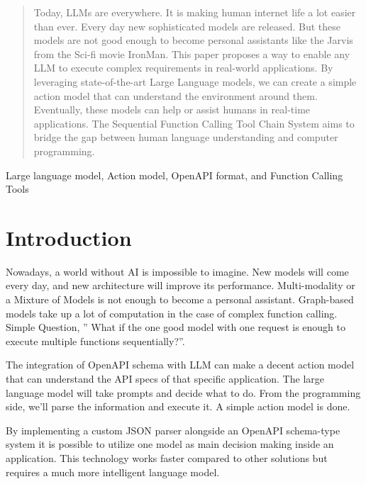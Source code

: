 \documentclass[conference]{IEEEtran}
\begin{document}
\maketitle

\begin{abstract}
    Today, LLMs are everywhere. It is making human internet life a lot easier than ever. Every day new sophisticated models are released. But these models are not good enough to become personal assistants like the Jarvis from the Sci-fi movie IronMan. This paper proposes a way to enable any LLM to execute complex requirements in real-world applications. By leveraging state-of-the-art Large Language models, we can create a simple action model that can understand the environment around them. Eventually, these models can help or assist humans in real-time applications. The Sequential Function Calling Tool Chain System aims to bridge the gap between human language understanding and computer programming.
\end{abstract}

\begin{IEEEkeywords}
    Large language model, Action model, OpenAPI format, and Function Calling Tools
\end{IEEEkeywords}

\section{Introduction}
Nowadays, a world without AI is impossible to imagine. New models will come
every day, and new architecture will improve its performance. Multi-modality or
a Mixture of Models is not enough to become a personal assistant. Graph-based
models take up a lot of computation in the case of complex function calling.
Simple Question, ” What if the one good model with one request is enough to
execute multiple functions sequentially?”.

The integration of OpenAPI schema with LLM can make a decent action model that
can understand the API specs of that specific application. The large language
model will take prompts and decide what to do. From the programming side, we’ll
parse the information and execute it. A simple action model is done.

By implementing a custom JSON parser alongside an OpenAPI schema-type system it
is possible to utilize one model as main decision making inside an application.
This technology works faster compared to other solutions but requires a much
more intelligent language model.
\end{document}
